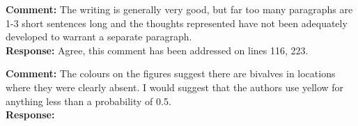 \documentclass{letter}
\begin{document}
\begin{letter}
\textbf{Comment:} 
The writing is generally very good, but far too many paragraphs are 1-3 short sentences long and the thoughts represented have not been adequately developed to warrant a separate paragraph.\\
\textbf{Response:} Agree, this comment has been addressed on lines 116, 223.

\textbf{Comment:} 
The colours on the figures suggest there are bivalves in locations where they were clearly absent. I would suggest that the authors use yellow for anything less than a probability of 0.5.\\
\textbf{Response:} %


\end{letter}
\end{document}
